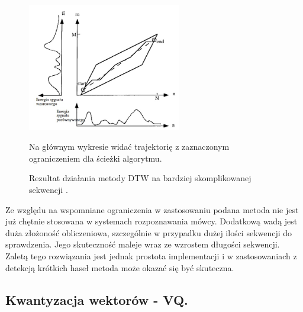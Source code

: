 \begin{figure}[ht!]
  \centering
    \includegraphics[width=0.6\textwidth]{dtwspeech.jpg}
    \caption{\label{dtwspeech}Rezultat działania metody DTW na bardziej skomplikowanej sekwencji \cite{campbell}.} Na głównym wykresie widać trajektorię z zaznaczonym ograniczeniem dla ścieżki algorytmu.
\end{figure}
Ze względu na wspomniane ograniczenia w zastosowaniu podana metoda nie jest już chętnie stosowana w systemach rozpoznawania mówcy. Dodatkową wadą jest duża złożoność obliczeniowa, szczególnie w przypadku dużej ilości sekwencji do sprawdzenia. Jego skuteczność maleje wraz ze wzrostem długości sekwencji. Zaletą tego rozwiązania jest jednak prostota implementacji i w zastosowaniach z detekcją krótkich haseł metoda może okazać się być skuteczna.

\subsection{Kwantyzacja wektorów - VQ.}
\label{vq}

